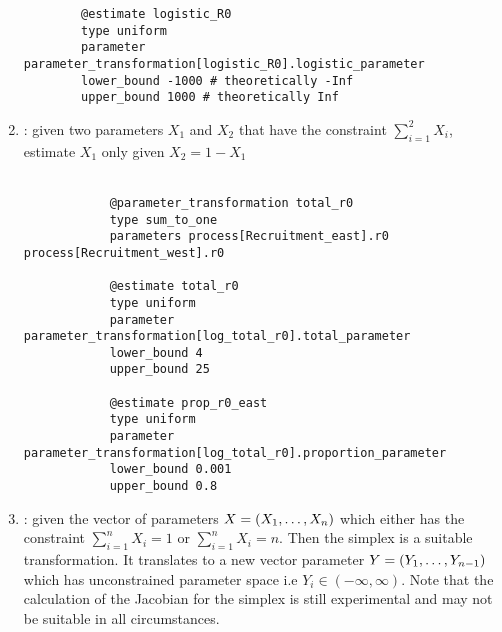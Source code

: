\begin{enumerate}
{{\begin{verbatim}
		@estimate logistic_R0
		type uniform
		parameter parameter_transformation[logistic_R0].logistic_parameter
		lower_bound -1000 # theoretically -Inf
		upper_bound 1000 # theoretically Inf
		\end{verbatim}}}
	
\item {} : given two parameters $X_1$ and $X_2$ that have the constraint $\sum_{i = 1}^2X_i$, estimate $X_1$ only given $X_2 = 1 - X_1$\\
\\
\label{sec:Transformation-SumToOne}
{\small{\begin{verbatim}
			@parameter_transformation total_r0
			type sum_to_one
			parameters process[Recruitment_east].r0 process[Recruitment_west].r0
			
			@estimate total_r0
			type uniform
			parameter parameter_transformation[log_total_r0].total_parameter
			lower_bound 4
			upper_bound 25
			
			@estimate prop_r0_east
			type uniform
			parameter parameter_transformation[log_total_r0].proportion_parameter
			lower_bound 0.001
			upper_bound 0.8		
\end{verbatim}}}

\item {} : given the vector of parameters $\boldmath{X} = (X_1, \dots, X_n)$ which either has the constraint $\sum_{i = 1}^n X_i = 1$ or $\sum_{i = 1}^n X_i = n$. Then the simplex is a suitable transformation. It translates to a new vector parameter \(\boldmath{Y} = (Y_1, \dots, Y_{n - 1})\) which has unconstrained parameter space i.e \(Y_i \in (-\infty, \infty)\). Note that the calculation of the Jacobian for the simplex is still experimental and may not be suitable in all circumstances.\\


\end{enumerate}
